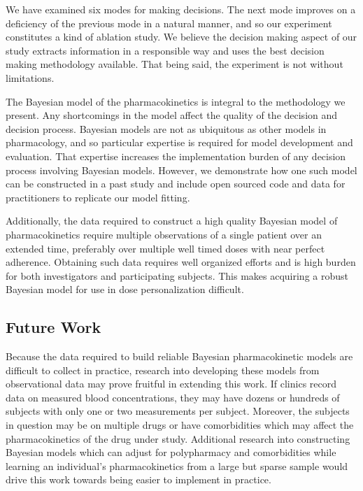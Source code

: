 We have examined six modes for making decisions.  The next mode improves on a deficiency of the previous mode in a natural manner, and so our experiment constitutes a kind of ablation study.  We believe the decision making aspect of our study extracts information in a responsible way and uses the best decision making methodology available.  That being said, the experiment is not without limitations.

The Bayesian model of the pharmacokinetics is integral to the methodology we present.  Any shortcomings in the model affect the quality of the decision and decision process.  Bayesian models are not as ubiquitous as other models in pharmacology, and so particular expertise is required for model development and evaluation.  That expertise increases the implementation burden of any decision process involving Bayesian models.  However, we demonstrate how one such model can be constructed in a past study \cite{pananos2020comparisons} and include open sourced code and data for practitioners to replicate our model fitting.

Additionally, the data required to construct a high quality Bayesian model of pharmacokinetics require multiple observations of a single patient over an extended time, preferably over multiple well timed doses with near perfect adherence.  Obtaining such data requires well organized efforts and is high burden for both investigators and participating subjects.  This makes acquiring a robust Bayesian model for use in dose personalization difficult.

\subsection{Future Work}

Because the data required to build reliable Bayesian pharmacokinetic models are difficult to collect in practice, research into developing these models from observational data may prove fruitful in extending this work. If clinics record data on measured blood concentrations, they may have dozens or hundreds of subjects with only one or two measurements per subject.  Moreover, the subjects in question may be on multiple drugs or have comorbidities which may affect the pharmacokinetics of the drug under study.  Additional research into constructing Bayesian models which can adjust for polypharmacy and comorbidities while learning an individual’s pharmacokinetics from a large but sparse sample would drive this work towards being easier to implement in practice.


